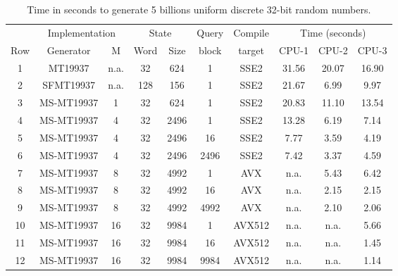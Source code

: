 \documentclass[preprint,1p,times]{elsarticle}
\begin{document}
\begin{table}
\begin{tabular}{c|c| c|c| c| c| c| c|c|c|} 
\cline{2-10}
 &  \multicolumn{2}{c|}{Implementation}   & \multicolumn{2}{c|}{State} & Query & Compile & \multicolumn{3}{c|}{Time (seconds)} \\
 \cline{1-5} \cline{8-10} \multicolumn{1}{|c|}{Row}
  & Generator  & M   & Word & Size & block & target & CPU-1 & CPU-2 & CPU-3 \\
 \hline \multicolumn{1}{|c|}{1}
 & MT19937         &  n.a. & 32   & 624 & 1     & SSE2    & 31.56 & 20.07 & 16.90 \\ 
 \hline \multicolumn{1}{|c|}{2}
 & SFMT19937       &  n.a. & 128  & 156 & 1     & SSE2    & 21.67 & 6.99 & 9.97 \\
 \hline \multicolumn{1}{|c|}{3}
 & MS-MT19937    & 1   & 32   & 624 & 1     & SSE2    & 20.83  & 11.10 & 13.54 \\
 \hline \multicolumn{1}{|c|}{4}
 & MS-MT19937    & 4   & 32  & 2496 & 1     & SSE2    & 13.28  & 6.19 & 7.14 \\
 \hline \multicolumn{1}{|c|}{5}
 & MS-MT19937    & 4   & 32  & 2496 & 16    & SSE2    &  7.77  & 3.59 & 4.19 \\
 \hline \multicolumn{1}{|c|}{6}
 & MS-MT19937    & 4   & 32  & 2496 & 2496  & SSE2    &  7.42  & 3.37 & 4.59 \\
 \hline \multicolumn{1}{|c|}{7}
 & MS-MT19937     & 8   & 32  & 4992 & 1    & AVX     & n.a.   &5.43  & 6.42 \\
 \hline \multicolumn{1}{|c|}{8}
 & MS-MT19937     & 8   & 32  & 4992 & 16   & AVX     & n.a.   &2.15  & 2.15 \\
 \hline \multicolumn{1}{|c|}{9}
 & MS-MT19937     & 8   & 32  & 4992 & 4992 & AVX     & n.a.   &2.10 & 2.06 \\
 \hline \multicolumn{1}{|c|}{10}
 & MS-MT19937   &  16   & 32  & 9984 & 1    & AVX512  & n.a.   & n.a. & 5.66 \\
 \hline \multicolumn{1}{|c|}{11}
 & MS-MT19937   &  16 & 32    & 9984 & 16   & AVX512  & n.a.   & n.a. & 1.45 \\
 \hline \multicolumn{1}{|c|}{12}
 & MS-MT19937   &  16  & 32    & 9984 & 9984 & AVX512  & n.a.   & n.a. & 1.14 \\
 \hline
\end{tabular}
\caption{\label{tab:results} Time in seconds to generate 5 billions uniform discrete 32-bit random numbers.}
\end{table}
\end{document}
